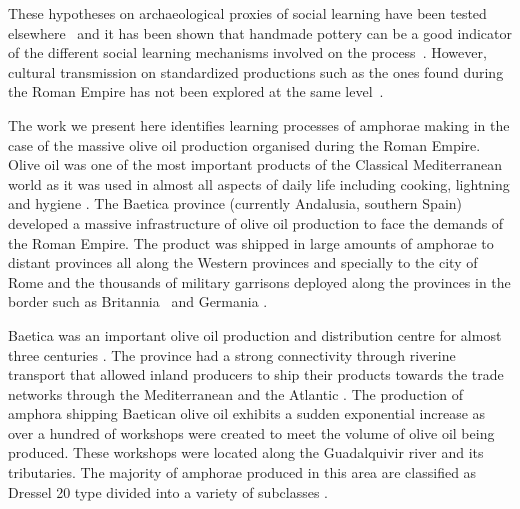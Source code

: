 \documentclass[review]{elsarticle}
\begin{document}
These hypotheses on archaeological proxies of social learning have been tested elsewhere~\citep{roux_standardization_2015} and it has been shown that handmade pottery can be a good indicator of the different social learning mechanisms involved on the process~\citep{steele_james_ceramic_2010,neiman_stylistic_1995, shennan_ceramic_2001}. However, cultural transmission on standardized productions such as the ones found during the Roman Empire has not been explored at the same level~\citep{bevan_mediterranean_2014}.

The work we present here identifies learning processes of amphorae making in the case of the massive olive oil production organised during the Roman Empire. Olive oil was one of the most important products of the Classical Mediterranean world as it was used in almost all aspects of daily life including cooking, lightning and hygiene \citep{mattingly_d.j._oil_1988}. The Baetica province (currently Andalusia, southern Spain) developed a massive infrastructure of olive oil production to face the demands of the Roman Empire. The product was shipped in large amounts of amphorae to distant provinces all along the Western provinces and specially to the city of Rome and the thousands of military garrisons deployed along the provinces in the border such as Britannia~\citep{monfort_britannia_1998,funari_economic_2005} and Germania \citep{remesal_annona_1986}. 

Baetica was an important olive oil production and distribution centre for almost three centuries \citep{millet_anforas_1998, rodriguez_baetican_1998,chic2005comercio,rodriguez_economioleicola_1977}. The province had a strong connectivity through riverine transport that allowed inland producers to ship their products towards the trade networks through the Mediterranean and the Atlantic \citep{garcia_vargas_enrique_formal_2010}. The production of amphora shipping Baetican olive oil exhibits a sudden exponential increase as over a hundred of workshops were created to meet the volume of olive oil being produced. These workshops were located along the Guadalquivir river and its tributaries. The majority of amphorae produced in this area are classified as Dressel 20 type divided into a variety of subclasses \citep{martin-kilcher_romischen_1994,berni_millet_epigrafianforica_2008}.
\end{document}
